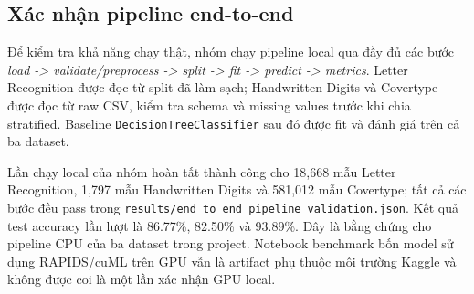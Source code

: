 \subsection{Xác nhận pipeline end-to-end}

Để kiểm tra khả năng chạy thật, nhóm chạy pipeline local qua đầy đủ các bước
\textit{load -> validate/preprocess -> split -> fit -> predict -> metrics}. Letter
Recognition được đọc từ split đã làm sạch; Handwritten Digits và Covertype được đọc từ
raw CSV, kiểm tra schema và missing values trước khi chia stratified. Baseline
\texttt{DecisionTreeClassifier} sau đó được fit và đánh giá trên cả ba dataset.

Lần chạy local của nhóm hoàn tất thành công cho 18,668 mẫu Letter Recognition, 1,797 mẫu
Handwritten Digits và 581,012 mẫu Covertype; tất cả các bước đều pass trong
\nolinkurl{results/end_to_end_pipeline_validation.json}. Kết quả test accuracy lần lượt là
86.77\%, 82.50\% và 93.89\%. Đây là bằng chứng cho pipeline CPU của ba dataset trong
project. Notebook benchmark bốn model sử dụng RAPIDS/cuML trên GPU vẫn là artifact phụ
thuộc môi trường Kaggle và không được coi là một lần xác nhận GPU local.
